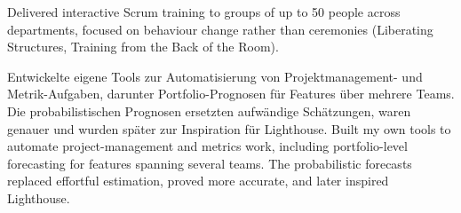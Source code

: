 \begin{cventries}
{\begin{cvitems}
{{				}
				{
					Delivered interactive Scrum training to groups of up to 50 people across departments, focused on behaviour change rather than ceremonies (Liberating Structures, Training from the Back of the Room).
				}
			}
			\item {
				{
					Entwickelte eigene Tools zur Automatisierung von Projektmanagement- und Metrik-Aufgaben, darunter Portfolio-Prognosen für Features über mehrere Teams. Die probabilistischen Prognosen ersetzten aufwändige Schätzungen, waren genauer und wurden später zur Inspiration für Lighthouse.
				}
				{
					Built my own tools to automate project-management and metrics work, including portfolio-level forecasting for features spanning several teams. The probabilistic forecasts replaced effortful estimation, proved more accurate, and later inspired Lighthouse.
				}
			}
		\end{cvitems}
	}	
	
	\cventry
	{ 	}
	{  	}
	{  	}
	{  	}
	{  	}
	

\end{cventries}

